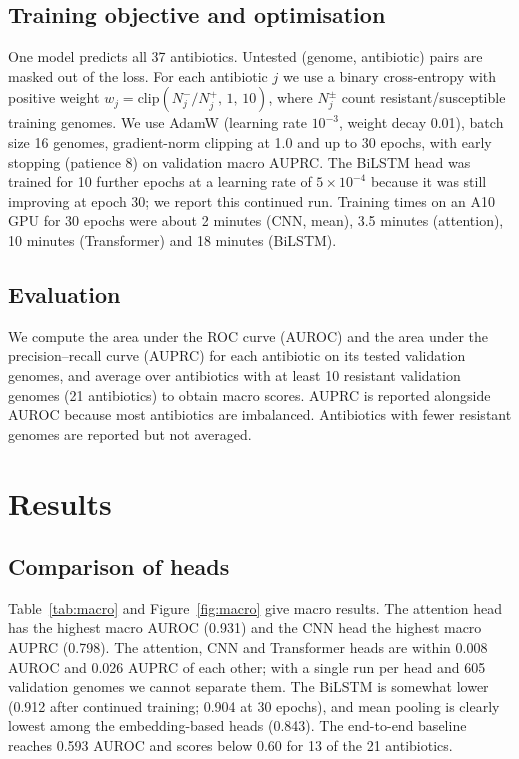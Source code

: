 \documentclass[11pt,a4paper]{article}
\begin{document}
\subsection{Training objective and optimisation}
One model predicts all 37 antibiotics. Untested (genome, antibiotic) pairs are masked out of the loss. For each antibiotic $j$ we use a binary cross-entropy with positive weight
$w_j = \mathrm{clip}(N_j^{-}/N_j^{+},\,1,\,10)$, where $N_j^{\pm}$ count resistant/susceptible training genomes.
We use AdamW \citep{loshchilov2019} (learning rate $10^{-3}$, weight decay 0.01), batch size 16 genomes, gradient-norm clipping at 1.0 and up to 30 epochs,
with early stopping (patience 8) on validation macro AUPRC. The BiLSTM head was trained for 10 further epochs at a learning rate of $5\times10^{-4}$ because it was still improving at epoch 30; we report this continued run.
Training times on an A10 GPU for 30 epochs were about 2 minutes (CNN, mean), 3.5 minutes (attention), 10 minutes (Transformer) and 18 minutes (BiLSTM).

\subsection{Evaluation}
We compute the area under the ROC curve (AUROC) and the area under the precision--recall curve (AUPRC) \citep{davis2006} for each antibiotic on its tested validation genomes, and average over
antibiotics with at least 10 resistant validation genomes (21 antibiotics) to obtain macro scores.
AUPRC is reported alongside AUROC because most antibiotics are imbalanced. Antibiotics with fewer resistant genomes are reported but not averaged.

\section{Results}
\subsection{Comparison of heads}
Table~\ref{tab:macro} and Figure~\ref{fig:macro} give macro results. The attention head has the highest macro AUROC (0.931) and the CNN head the highest macro AUPRC (0.798).
The attention, CNN and Transformer heads are within 0.008 AUROC and 0.026 AUPRC of each other; with a single run per head and 605 validation genomes we cannot separate them.
The BiLSTM is somewhat lower (0.912 after continued training; 0.904 at 30 epochs), and mean pooling is clearly lowest among the embedding-based heads (0.843).
The end-to-end baseline reaches 0.593 AUROC and scores below 0.60 for 13 of the 21 antibiotics.
\end{document}
